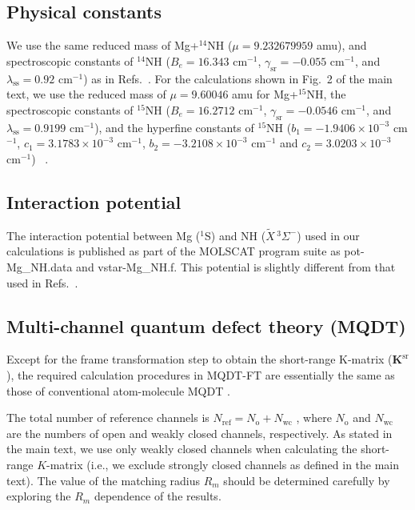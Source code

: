 \documentclass[reprint,amssymb,noeprint,twocolumn,longbibliography]{revtex4-2}
\begin{document}
\subsection{Physical constants}
We use the same reduced mass of Mg+$^{14}$NH ($\mu=9.232679959$ amu), and spectroscopic constants of $^{14}$NH  ($B_e=16.343$ cm$^{-1}$, $\gamma_\mathrm{sr}=-0.055$ cm$^{-1}$, and $\lambda_\mathrm{ss}=0.92$ cm$^{-1}$) as in Refs.~\cite{Wallis_09,MOLSCAT}. For the calculations  shown in Fig.~2 of the main text, we use the reduced mass of $\mu=9.60046$ amu for Mg+$^{15}$NH, the spectroscopic constants of $^{15}$NH ($B_e=16.2712$ cm$^{-1}$, $\gamma_\mathrm{sr}=-0.0546$ cm$^{-1}$, and $\lambda_\mathrm{ss}=0.9199$ cm$^{-1}$), and 
the hyperfine constants of $^{15}$NH ($b_1=-1.9406\times 10^{-3}$ cm$^{-1}$, $c_1=3.1783\times 10^{-3}$ cm$^{-1}$, $b_2=-3.2108\times 10^{-3}$ cm$^{-1}$ and $c_2=3.0203\times 10^{-3}$ cm$^{-1}$) ~\cite{Bizzocchi_18}. 


\subsection{Interaction potential}
The interaction potential between Mg ($^1$S) and NH ($\tilde{X}\, ^3\Sigma^-$) used in our calculations is published as part of the MOLSCAT program suite \cite{MOLSCAT} as pot-Mg\_NH.data and vstar-Mg\_NH.f. 
This potential is slightly different from that used in Refs.~\cite{Wallis_09,Maykel_11,Croft_11}.




\subsection{Multi-channel quantum defect theory (MQDT)}

Except for the frame transformation step to obtain the short-range K-matrix ($\bm{K}^\text{sr}$), the required calculation procedures in MQDT-FT are essentially the same as those of conventional atom-molecule MQDT \cite{Croft_11,Croft_12}. 

The total number of reference channels is $N_\mathrm{ref} = N_\mathrm{o} +N_\mathrm{wc}$ \cite{Croft_11}, where $N_\mathrm{o}$ and $N_\mathrm{wc}$ are the numbers of open and weakly closed channels, respectively.
As stated in the main text,  we use only  weakly closed channels when calculating the short-range $K$-matrix (i.e., we exclude strongly closed channels as defined in the main text).
The value of the matching radius $R_m$ should be determined carefully by exploring the $ R_m$ dependence of the results.
\end{document}
